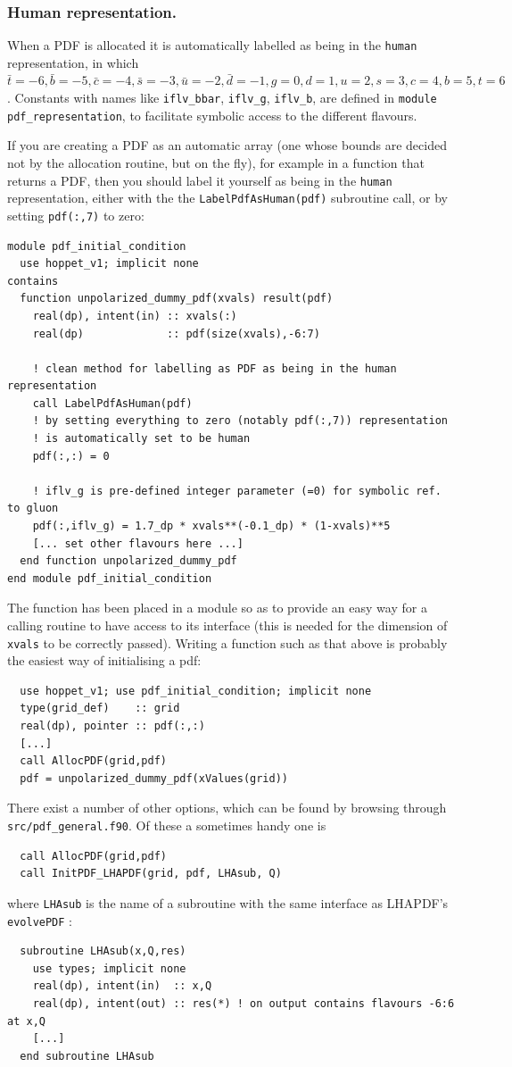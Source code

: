 \documentclass[12pt]{article}
\newcommand{\ttt}[1]{\texttt{#1}}
\begin{document}
\subsubsection{Human representation.}
\label{sec:human-rep}
When a PDF is allocated it is automatically labelled as being in the
\ttt{human} representation, in which $\bar t={-6}, \bar b={-5}, \bar
c={-4}, \bar s={-3}, \bar u={-2}, \bar d={-1}, g={0}, d={1}, u={2},
s={3}, c={4}, b={5}, t={6} $. Constants with names like
\ttt{iflv\_bbar}, \ttt{iflv\_g}, \ttt{iflv\_b}, are defined in
\ttt{module pdf\_representation}, to facilitate symbolic access to the
different flavours.

If you are creating a PDF as an automatic array (one whose bounds are
decided not by the allocation routine, but on the fly), for example in
a function that returns a PDF, then you should label it yourself as
being in the \ttt{human} representation, either with the the
\ttt{LabelPdfAsHuman(pdf)} subroutine call, or by setting
\ttt{pdf(:,7)} to zero:
\begin{verbatim}
module pdf_initial_condition
  use hoppet_v1; implicit none
contains
  function unpolarized_dummy_pdf(xvals) result(pdf)
    real(dp), intent(in) :: xvals(:)
    real(dp)             :: pdf(size(xvals),-6:7)

    ! clean method for labelling as PDF as being in the human representation
    call LabelPdfAsHuman(pdf)
    ! by setting everything to zero (notably pdf(:,7)) representation
    ! is automatically set to be human
    pdf(:,:) = 0
    
    ! iflv_g is pre-defined integer parameter (=0) for symbolic ref. to gluon
    pdf(:,iflv_g) = 1.7_dp * xvals**(-0.1_dp) * (1-xvals)**5
    [... set other flavours here ...]
  end function unpolarized_dummy_pdf
end module pdf_initial_condition
\end{verbatim}
The function has been placed in a module so as to provide an easy way
for a calling routine to have access to its interface (this is needed
for the dimension of \ttt{xvals} to be correctly passed).  Writing a
function such as that above is probably the easiest way of
initialising a pdf:
\begin{verbatim}
  use hoppet_v1; use pdf_initial_condition; implicit none
  type(grid_def)    :: grid
  real(dp), pointer :: pdf(:,:)
  [...]
  call AllocPDF(grid,pdf)
  pdf = unpolarized_dummy_pdf(xValues(grid))
\end{verbatim}
There exist a number of other options, which can be found by browsing
through \ttt{src/pdf\_general.f90}. Of these a sometimes handy one is
\begin{verbatim}
  call AllocPDF(grid,pdf)
  call InitPDF_LHAPDF(grid, pdf, LHAsub, Q)
\end{verbatim}
where \texttt{LHAsub} is the name of a subroutine 
with the same interface as LHAPDF's \ttt{evolvePDF} \cite{LHAPDF}:
\begin{verbatim}
  subroutine LHAsub(x,Q,res)
    use types; implicit none
    real(dp), intent(in)  :: x,Q
    real(dp), intent(out) :: res(*) ! on output contains flavours -6:6 at x,Q
    [...]
  end subroutine LHAsub
\end{verbatim}
\end{document}

